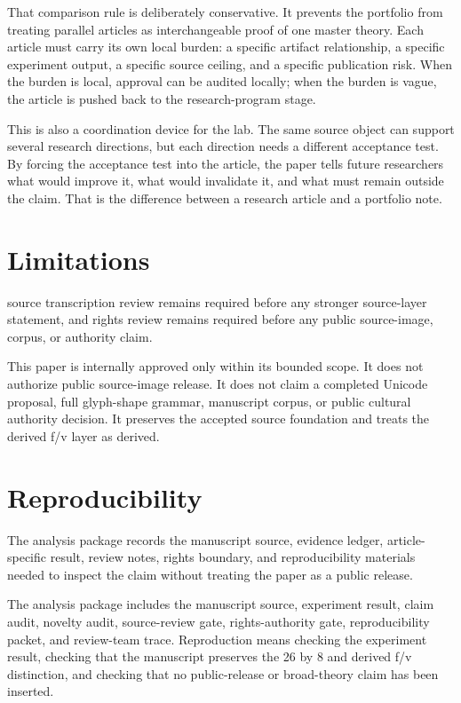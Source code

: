 \documentclass[sigconf,nonacm]{acmart}
\begin{document}
That comparison rule is deliberately conservative. It prevents the portfolio
from treating parallel articles as interchangeable proof of one master theory.
Each article must carry its own local burden: a specific artifact relationship,
a specific experiment output, a specific source ceiling, and a specific
publication risk. When the burden is local, approval can be audited locally; when
the burden is vague, the article is pushed back to the research-program stage.

This is also a coordination device for the lab. The same source object can
support several research directions, but each direction needs a different
acceptance test. By forcing the acceptance test into the article, the paper tells
future researchers what would improve it, what would invalidate it, and what
must remain outside the claim. That is the difference between a research article
and a portfolio note.

\section{Limitations}
source transcription review remains required before any stronger source-layer statement, and rights review remains required before any public source-image, corpus, or authority claim. 

This paper is internally approved only within its bounded scope. It does not
authorize public source-image release. It does not claim a completed Unicode
proposal, full glyph-shape grammar, manuscript corpus, or public cultural
authority decision. It preserves the accepted source foundation and treats the
derived f/v layer as derived.

\section{Reproducibility}
The analysis package records the manuscript source, evidence ledger, article-specific result, review notes, rights boundary, and reproducibility materials needed to inspect the claim without treating the paper as a public release. 

The analysis package includes the manuscript source, experiment result, claim
audit, novelty audit, source-review gate, rights-authority gate,
reproducibility packet, and review-team trace. Reproduction means checking the
experiment result, checking that the manuscript preserves the 26 by 8 and
derived f/v distinction, and checking that no public-release or broad-theory
claim has been inserted.
\end{document}
